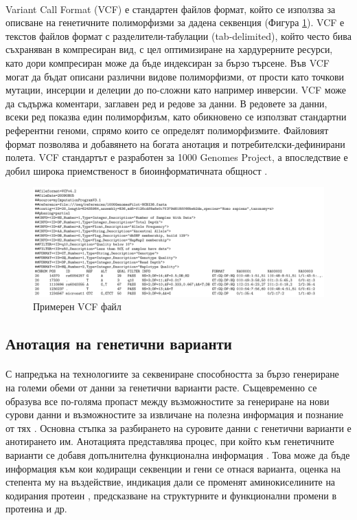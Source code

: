 \documentclass[pdftex,cyrillic,14pt,a4page,twoside,openright]{extreport}
\begin{document}
\paragraph{}
Variant Call Format (VCF) е стандартен файлов формат, който се използва за описване на генетичните полиморфизми за дадена секвенция (Фигура \ref{fig:example_vcf}). VCF е текстов файлов формат с разделители-табулации (tab-delimited), който често бива съхраняван в компресиран вид, с цел оптимизиране на хардурерните ресурси, като дори компресиран може да бъде индексиран за бързо търсене. Във VCF могат да бъдат описани различни видове полиморфизми, от прости като точкови мутации, инсерции и делеции до по-сложни като например инверсии. VCF може да съдържа коментари, заглавен ред и редове за данни. В редовете за данни, всеки ред показва един полиморфизъм, като обикновено се използват стандартни референтни геноми, спрямо които се определят полиморфизмите. Файловият формат позволява и добавянето на богата анотация и потребителски-дефинирани полета. VCF стандартът е разработен за 1000 Genomes Project, а впоследствие е добил широка приемственост в биоинформатичната общност \cite{danecek2011}.

\begin{figure}[h]
  \centering
  \includegraphics[width=17cm]{figures/vcf}
  \caption {Примерен VCF файл}
  \label{fig:example_vcf}
\end{figure}


\subsection{Анотация на генетични варианти}
\paragraph{}
С напредъка на технологиите за секвениране способността за бързо генериране на големи обеми от данни за генетични варианти расте. Същевременно се образува все по-голяма пропаст между възможностите за генериране на нови сурови данни и възможностите за извличане на полезна информация и познание от тях \cite{yang2015}. Основна стъпка за разбирането на суровите данни с генетични варианти е анотирането им. Анотацията представлява процес, при който към генетичните варианти се добавя допълнителна функционална информация \cite{mccarthy2014}. Това може да бъде информация към кои кодиращи секвенции и гени се отнася варианта, оценка на степента му на въздействие, индикация дали се променят аминокиселините на кодирания протеин \cite{cingolani2012}, предсказване на структурните и функционални промени в протеина \cite{mccarthy2014} и др.
\end{document}
